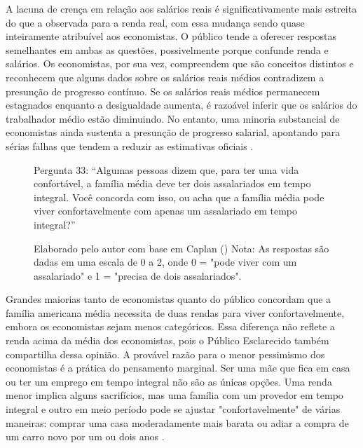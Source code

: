 A lacuna de crença em relação aos salários reais é significativamente mais estreita do que a observada para a renda real, com essa mudança sendo quase inteiramente atribuível aos economistas. O público tende a oferecer respostas semelhantes em ambas as questões, possivelmente porque confunde renda e salários. Os economistas, por sua vez, compreendem que são conceitos distintos e reconhecem que alguns dados sobre os salários reais médios contradizem a presunção de progresso contínuo. Se os salários reais médios permanecem estagnados enquanto a desigualdade aumenta, é razoável inferir que os salários do trabalhador médio estão diminuindo. No entanto, uma minoria substancial de economistas ainda sustenta a presunção de progresso salarial, apontando para sérias falhas que tendem a reduzir as estimativas oficiais \cite{Myths-of-Rich-and-Poor}.

\begin{figure}[H]
    \centering
    \caption*{Pergunta 33: “Algumas pessoas dizem que, para ter uma vida confortável, a família média deve ter dois assalariados em tempo integral. Você concorda com isso, ou acha que a família média pode viver confortavelmente com apenas um assalariado em tempo integral?”}
    \caption{Elaborado pelo autor com base em Caplan (\citeyear{The_Myth_of_the_Rational_Voter}) \newline
    Nota: As respostas são dadas em uma escala de 0 a 2, onde 0 = "pode viver com um assalariado" e 1 = "precisa de dois assalariados".}
    \label{fig:pergunta_33}
\end{figure}

Grandes maiorias tanto de economistas quanto do público concordam que a família americana média necessita de duas rendas para viver confortavelmente, embora os economistas sejam menos categóricos. Essa diferença não reflete a renda acima da média dos economistas, pois o Público Esclarecido também compartilha dessa opinião. A provável razão para o menor pessimismo dos economistas é a prática do pensamento marginal. Ser uma mãe que fica em casa ou ter um emprego em tempo integral não são as únicas opções. Uma renda menor implica alguns sacrifícios, mas uma família com um provedor em tempo integral e outro em meio período pode se ajustar "confortavelmente" de várias maneiras: comprar uma casa moderadamente mais barata ou adiar a compra de um carro novo por um ou dois anos \cite{The_Myth_of_the_Rational_Voter}.


